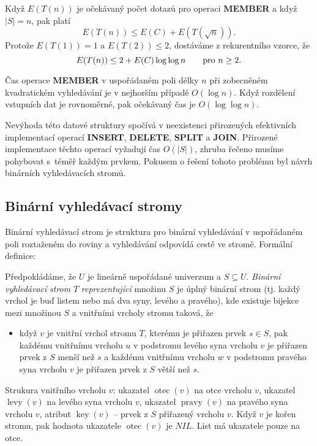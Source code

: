 \documentclass[a4paper,12pt]{article}
\DeclareMathOperator*{\otec}{otec}
\DeclareMathOperator*{\levy}{levy}
\DeclareMathOperator*{\pravy}{pravy}
\DeclareMathOperator*{\key}{key}
\begin{document}
Když $E(T(n))$ je očekávaný počet dotazů pro operaci 
{\bf MEMBER} a když $|S|=n$, pak platí 
$$E(T(n))\le E(C)+E(T(\sqrt n)).$$
Protože $E(T(1))=1$ a $E(T(2))\le 2$, dostáváme z rekurentního 
vzorce, že 
$$E(T(n))\le 2+E(C)\log\log n\qquad\text{\rm pro }n\ge 2.$$

\begin{veta}Čas operace {\bf MEMBER} v uspořádaném poli délky $
n$ při 
zobec\-něném kvadra\-tickém vyhledávání je v nejhorším 
přípa\-dě $O(\log n)$. Když rozdělení vstupních dat je 
rovno\-měr\-né, pak očekávaný čas je $O(\log\log n)$. 
\end{veta}

Nevýhoda této datové struktury 
spočívá v neexistenci přiroze\-ných efektivních implementací 
ope\-rací {\bf INSERT}, {\bf DELETE}, {\bf SPLIT} a {\bf JOIN}. Přirozené 
implementace těchto ope\-rací vyža\-dují čas 
$O(|S|)$, zhruba řečeno musíme pohybovat s~téměř kaž\-dým prvkem. 
Pokusem o řešení 
tohoto problému byl návrh binár\-ních vyhledávacích 
stromů.

\subsection{Binární vyhledávací stromy}

Binární vyhledávací strom je struktura pro binár\-ní 
vyhledávání v uspořáda\-ném poli rozta\-ženém do roviny a 
vyhledávání odpo\-ví\-dá cestě ve stro\-mě. Formální 
definice:

Předpokládáme, že $U$ je lineárně uspořádané 
univerzum a $S\subseteq U$.  \emph{Binární} \emph{vyhledávací} 
\emph{strom} $T$ \emph{reprezentující} množinu $S$ je úplný 
binární strom (tj. každý vrchol je buď listem nebo má 
dva syny, levého a pravého), kde existuje bijekce mezi 
množinou $S$ a vnitřními vrcholy stromu taková, že
\begin{itemize}
\item
když $v$ je vnitřní vrchol stromu $T$, kterému je přiřazen 
prvek $s\in S$, pak každému vnitřnímu vrcholu $u$ v 
podstromu levého syna vrcholu $v$ je přiřazen prvek z $S$ 
menší než $s$ a každému vnitřnímu vrcholu $
w$ v 
podstromu pravého syna vrcholu $v$ je přiřazen prvek z $S$ 
větší než $s$.
\end{itemize}

Strukura vnitřního vrcholu $v$:\newline 
ukazatel $\otec(v)$ na otce vrcholu $v$,\newline 
ukazatel $\levy(v)$ na levého syna vrcholu $v$,\newline 
ukazatel $\pravy(v)$ na pravého syna vrcholu $v$,\newline 
atribut $\key(v)$ -- prvek z $S$ přiřazený vrcholu $v$.
Když $v$ je kořen stromu, pak hodnota ukazatele $\otec(v)$ 
je $NIL$. List má ukazatele pouze na otce.
\end{document}
